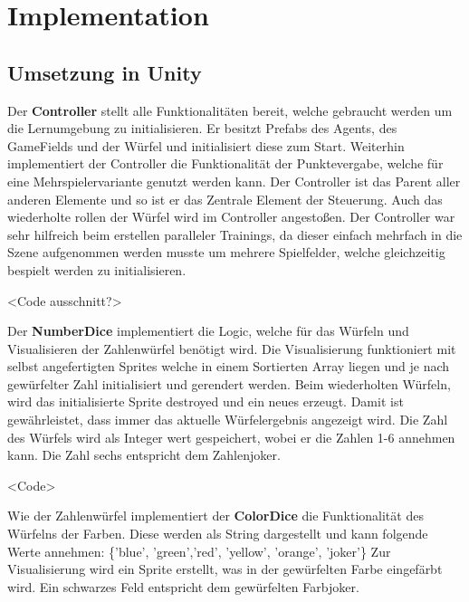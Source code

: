 

\clearpage
\chapter{Implementation}

\section{Umsetzung in Unity}
Der \textbf{Controller} stellt alle Funktionalitäten bereit, welche gebraucht werden um die Lernumgebung zu initialisieren.
Er besitzt Prefabs des Agents, des GameFields und der Würfel und initialisiert diese zum Start.
Weiterhin implementiert der Controller die Funktionalität der Punktevergabe, welche für eine Mehrspielervariante genutzt werden kann.
Der Controller ist das Parent aller anderen Elemente und so ist er das Zentrale Element der Steuerung. Auch das wiederholte rollen der Würfel wird im Controller angestoßen.
Der Controller war sehr hilfreich beim erstellen paralleler Trainings, da dieser einfach mehrfach in die Szene aufgenommen werden musste um mehrere Spielfelder, welche gleichzeitig bespielt werden zu initialisieren.

<Code ausschnitt?>

Der \textbf{NumberDice} implementiert die Logic, welche für das Würfeln und Visualisieren der Zahlenwürfel benötigt wird.
Die Visualisierung funktioniert mit selbst angefertigten Sprites welche in einem Sortierten Array liegen und je nach gewürfelter Zahl initialisiert und gerendert werden.
Beim wiederholten Würfeln, wird das initialisierte Sprite destroyed und ein neues erzeugt.
Damit ist gewährleistet, dass immer das aktuelle Würfelergebnis angezeigt wird.
Die Zahl des Würfels wird als Integer wert gespeichert, wobei er die Zahlen 1-6 annehmen kann.
Die Zahl sechs entspricht dem Zahlenjoker.

<Code>

Wie der Zahlenwürfel implementiert der \textbf{ColorDice} die Funktionalität des Würfelns der Farben.
Diese werden als String dargestellt und kann folgende Werte annehmen: \{'blue', 'green','red', 'yellow', 'orange', 'joker'\}
Zur Visualisierung wird ein Sprite erstellt, was in der gewürfelten Farbe eingefärbt wird.
Ein schwarzes Feld entspricht dem gewürfelten Farbjoker.


